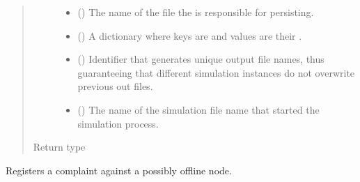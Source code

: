 \documentclass[letterpaper,10pt,english]{sphinxmanual}
\begin{document}
\begin{fulllineitems}
\begin{fulllineitems}
\begin{quote}
\begin{description}
\begin{itemize}
\item {} 
 () \textendash{} The name of the file the  is responsible for
persisting.

\item {} 
 ({\hyperref[\detokenize{app:app.type_hints.NodeDict}]{}}) \textendash{} A dictionary where keys are {\hyperref[\detokenize{app.domain:app.domain.network_nodes.Node.id}]{}} and values are their
{\hyperref[\detokenize{app.domain:app.domain.network_nodes.Node}]{}}.

\item {} 
 () \textendash{} Identifier that generates unique output file names,
thus guaranteeing that different simulation instances do not
overwrite previous out files.

\item {} 
 () \textendash{} The name of the simulation file name that started
the simulation process.

\end{itemize}

\item[{Return type}] \leavevmode
{}

\end{description}\end{quote}

\end{fulllineitems}


\begin{fulllineitems}
\label{\detokenize{app.domain:app.domain.cluster_groups.SGClusterExt.complain}}
Registers a complaint against a possibly offline node.


\end{fulllineitems}
\end{fulllineitems}
\end{document}
